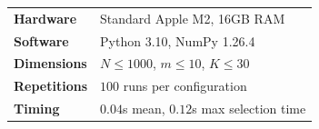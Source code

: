 \begin{tabular}{ll}
\toprule
\textbf{Hardware} & Standard Apple M2, 16GB RAM \\
\textbf{Software} & Python 3.10, NumPy 1.26.4 \\
\textbf{Dimensions} & $N \le 1000$, $m \le 10$, $K \le 30$ \\
\textbf{Repetitions} & $100$ runs per configuration \\
\textbf{Timing} & $0.04$s mean, $0.12$s max selection time \\
\bottomrule
\end{tabular}